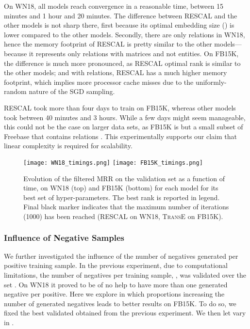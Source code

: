 \documentclass[twoside,11pt]{article}
\renewcommand{\cite}{\citep}
\begin{document}
On WN18, all models reach convergence in a reasonable time, between 15 minutes
and 1 hour and 20 minutes. The difference between RESCAL and the other models
is not sharp there, first because its optimal embedding size () 
is lower compared to the other models. 
Secondly, there are only  relations
in WN18, hence the memory footprint of RESCAL is pretty similar
to the other models---because it represents only relations with
matrices and not entities.
On FB15K, the difference is much more pronounced, as RESCAL optimal rank
is similar to the other models; and with  relations,
RESCAL has a much higher memory footprint, which implies more 
processor cache misses due to the uniformly-random nature of the SGD sampling.

RESCAL took more than
four days to train on FB15K, whereas other models took between 40 minutes and
3 hours. While a few days might seem manageable, this could not be
the case on larger data sets, as FB15K is but a small
subset of Freebase that contains  relations
\cite{Bollacker2008}. This experimentally supports our claim
that linear complexity is required for scalability.



\begin{figure}[t]
	\centering
	\texttt{[image: WN18\_timings.png]} 
	\texttt{[image: FB15K\_timings.png]}
\caption{Evolution of the filtered MRR on the validation set as a function of time, on WN18 (top) and FB15K (bottom) for each model for its best set of hyper-parameters. The best rank  is reported in legend. Final black marker indicates that the maximum number of iterations (1000) has been reached (RESCAL on WN18, \textsc{TransE} on FB15K).}
	\label{fig:training times}
\end{figure}


\subsubsection{Influence of Negative Samples}
We further investigated the influence of the number of negatives generated per positive training sample. In the previous experiment, due to computational limitations, the number of negatives per training sample, , was validated over the set . On WN18 it proved to be of no help to have more than one generated negative per positive. Here we explore in which proportions increasing the number of generated negatives leads to better results on FB15K.
To do so, we fixed the best validated  obtained from the previous experiment. We then let  vary in .
\end{document}
